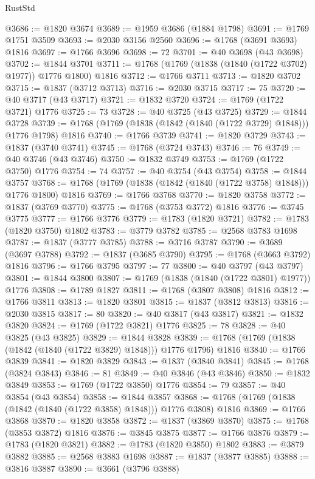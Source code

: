 \begin{lexlean}{RustStd}
\begin{coremodule}
@3686 := @1820 @3674
@3689 := @1959 @3686 (@1884 @1798)
@3691 := @1769 @1751 @3509
@3693 := @2030 @3156 @2560
@3696 := @1768 (@3691 @3693) @1816
@3697 := @1766 @3696
@3698 := 72
@3701 := @40 @3698 (@43 @3698)
@3702 := @1844 @3701
@3711 := @1768 (@1769 (@1838 (@1840 (@1722 @3702) @1977)) @1776 @1800) @1816
@3712 := @1766 @3711
@3713 := @1820 @3702
@3715 := @1837 (@3712 @3713)
@3716 := @2030 @3715
@3717 := 75
@3720 := @40 @3717 (@43 @3717)
@3721 := @1832 @3720
@3724 := @1769 (@1722 @3721) @1776
@3725 := 73
@3728 := @40 @3725 (@43 @3725)
@3729 := @1844 @3728
@3739 := @1768 (@1769 (@1838 (@1842 (@1840 (@1722 @3729) @1848))) @1776 @1798) @1816
@3740 := @1766 @3739
@3741 := @1820 @3729
@3743 := @1837 (@3740 @3741)
@3745 := @1768 (@3724 @3743)
@3746 := 76
@3749 := @40 @3746 (@43 @3746)
@3750 := @1832 @3749
@3753 := @1769 (@1722 @3750) @1776
@3754 := 74
@3757 := @40 @3754 (@43 @3754)
@3758 := @1844 @3757
@3768 := @1768 (@1769 (@1838 (@1842 (@1840 (@1722 @3758) @1848))) @1776 @1800) @1816
@3769 := @1766 @3768
@3770 := @1820 @3758
@3772 := @1837 (@3769 @3770)
@3775 := @1768 (@3753 @3772) @1816
@3776 := @3745 @3775
@3777 := @1766 @3776
@3779 := @1783 (@1820 @3721)
@3782 := @1783 (@1820 @3750) @1802
@3783 := @3779 @3782
@3785 := @2568 @3783 @1698
@3787 := @1837 (@3777 @3785)
@3788 := @3716 @3787
@3790 := @3689 (@3697 @3788)
@3792 := @1837 (@3685 @3790)
@3795 := @1768 (@3663 @3792) @1816
@3796 := @1766 @3795
@3797 := 77
@3800 := @40 @3797 (@43 @3797)
@3801 := @1844 @3800
@3807 := @1769 (@1838 (@1840 (@1722 @3801) @1977)) @1776
@3808 := @1789 @1827
@3811 := @1768 (@3807 @3808) @1816
@3812 := @1766 @3811
@3813 := @1820 @3801
@3815 := @1837 (@3812 @3813)
@3816 := @2030 @3815
@3817 := 80
@3820 := @40 @3817 (@43 @3817)
@3821 := @1832 @3820
@3824 := @1769 (@1722 @3821) @1776
@3825 := 78
@3828 := @40 @3825 (@43 @3825)
@3829 := @1844 @3828
@3839 := @1768 (@1769 (@1838 (@1842 (@1840 (@1722 @3829) @1848))) @1776 @1796) @1816
@3840 := @1766 @3839
@3841 := @1820 @3829
@3843 := @1837 (@3840 @3841)
@3845 := @1768 (@3824 @3843)
@3846 := 81
@3849 := @40 @3846 (@43 @3846)
@3850 := @1832 @3849
@3853 := @1769 (@1722 @3850) @1776
@3854 := 79
@3857 := @40 @3854 (@43 @3854)
@3858 := @1844 @3857
@3868 := @1768 (@1769 (@1838 (@1842 (@1840 (@1722 @3858) @1848))) @1776 @3808) @1816
@3869 := @1766 @3868
@3870 := @1820 @3858
@3872 := @1837 (@3869 @3870)
@3875 := @1768 (@3853 @3872) @1816
@3876 := @3845 @3875
@3877 := @1766 @3876
@3879 := @1783 (@1820 @3821)
@3882 := @1783 (@1820 @3850) @1802
@3883 := @3879 @3882
@3885 := @2568 @3883 @1698
@3887 := @1837 (@3877 @3885)
@3888 := @3816 @3887
@3890 := @3661 (@3796 @3888)

\end{coremodule}
\end{lexlean}

